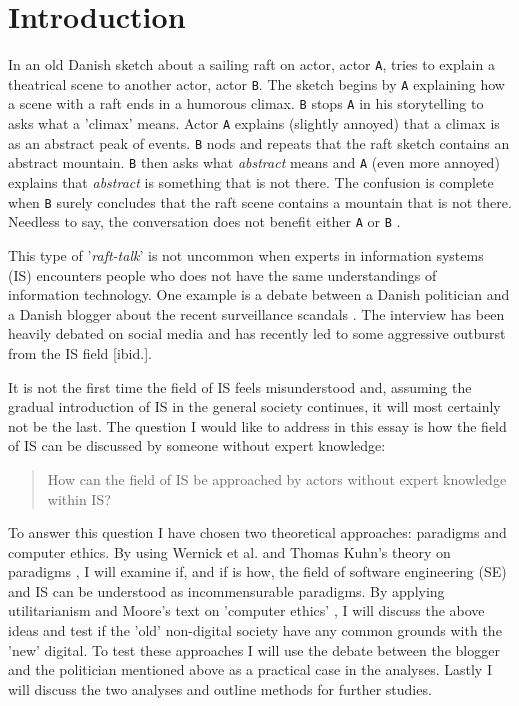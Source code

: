 \documentclass{article}
\begin{document}
\section{Introduction}
In an old Danish sketch about a sailing raft on actor, actor \texttt{A}, tries to explain a theatrical scene to another actor, actor \texttt{B}. The sketch begins by \texttt{A} explaining how a scene with a raft ends in a humorous climax. \texttt{B} stops \texttt{A} in his storytelling to asks what a 'climax' means. Actor \texttt{A} explains (slightly annoyed) that a climax is as an abstract peak of events. \texttt{B} nods and repeats that the raft sketch contains an abstract mountain. \texttt{B} then asks what \textit{abstract} means and \texttt{A} (even more annoyed) explains that \textit{abstract} is something that is not there. The confusion is complete when \texttt{B} surely concludes that the raft scene contains a mountain that is not there. Needless to say, the conversation does not benefit either \texttt{A} or \texttt{B} \citep{Raft:2014}.

This type of '\textit{raft-talk}' is not uncommon when experts in information systems (IS) encounters people who does not have the same understandings of information technology. One example is a debate between a Danish politician and a Danish blogger about the recent surveillance scandals \citep{Bramsen:2014}. The interview has been heavily debated on social media and has recently led to some aggressive outburst from the IS field [ibid.]. 

It is not the first time the field of IS feels misunderstood %
and, assuming the gradual introduction of IS in the general society continues, it will most certainly not be the last.
The question I would like to address in this essay is how the field of IS can be discussed by someone without expert knowledge:
\begin{quote}
How can the field of IS be approached by actors without expert knowledge within IS?
\end{quote}

To answer this question I have chosen two theoretical approaches: paradigms and computer ethics. 
By using Wernick et al. and Thomas Kuhn's theory on paradigms \citep{Wernick:2004, Holm:2014}, I will examine if, and if is how, the field of software engineering (SE) and IS can be understood as incommensurable paradigms.
By applying utilitarianism and Moore's text on 'computer ethics' \citep{Moor:1985}, I will discuss the above ideas and test if the 'old' non-digital society have any common grounds with the 'new' digital.
To test these approaches I will use the debate between the blogger and the politician mentioned above as a practical case in the analyses. Lastly I will discuss the two analyses and outline methods for further studies.
\end{document}
